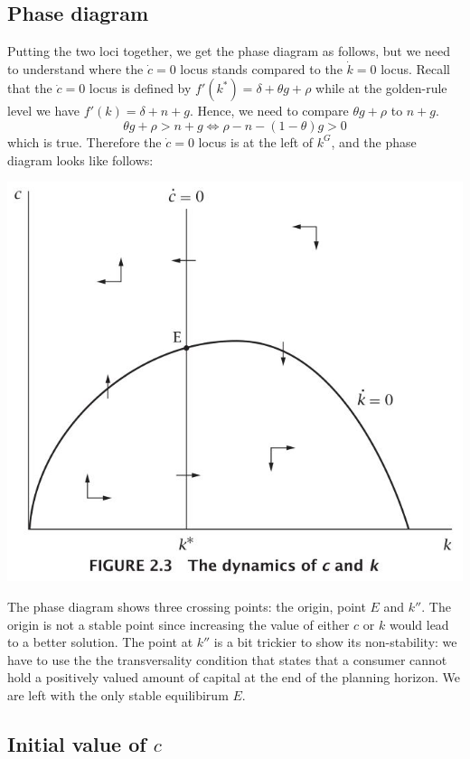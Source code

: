 \documentclass[12pt]{report}
\begin{document}
\subsection{Phase diagram}

Putting the two loci together, we get the phase diagram as follows, but we need to understand where the $\dot c =0$ locus stands compared to the $\dot k = 0$ locus. Recall that the $\dot c = 0$ locus is defined by $f'(k^*)  = \delta + \theta g + \rho$ while at the golden-rule level we have $f'(k) = \delta + n + g$. Hence, we need to compare $\theta g + \rho$ to $n + g$. $$\theta g + \rho > n + g \Leftrightarrow \rho - n - (1 - \theta)g > 0 $$ which is true. Therefore the $\dot c = 0 $ locus is at the left of $k^G$, and the phase diagram looks like follows: \begin{center}
\includegraphics[scale=0.75]{images/Ramseyphase}
\end{center}

The phase diagram shows three crossing points: the origin, point $E$ and $k''$. The origin is not a stable point since increasing the value of either $c$ or $k$ would lead to a better solution. The point at $k''$ is a bit trickier to show its non-stability: we have to use the the transversality condition that states that a consumer cannot hold a positively valued amount of capital at the end of the planning horizon. We are left with the only stable equilibirum $E$.

\subsection{Initial value of $c$}
\end{document}
